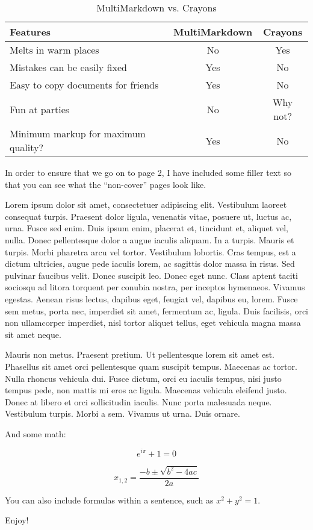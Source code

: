 \begin{table}[htbp]
\begin{minipage}{\linewidth}
\setlength{\tymax}{0.5\linewidth}
\centering
\small
\caption{MultiMarkdown vs. Crayons}
\label{multimarkdownvs.crayons}
\begin{tabular}{@{}lcc@{}} \toprule
Features&MultiMarkdown&Crayons\\
\midrule
Melts in warm places&No&Yes\\
Mistakes can be easily fixed&Yes&No\\
Easy to copy documents for friends&Yes&No\\
Fun at parties&No&Why not?\\

\midrule
Minimum markup for maximum quality?&Yes&No\\

\bottomrule

\end{tabular}
\end{minipage}
\end{table}


In order to ensure that we go on to page 2, I have included some filler text
so that you can see what the ``non-cover'' pages look like.

Lorem ipsum dolor sit amet, consectetuer adipiscing elit. Vestibulum laoreet
consequat turpis. Praesent dolor ligula, venenatis vitae, posuere ut, luctus
ac, urna. Fusce sed enim. Duis ipsum enim, placerat et, tincidunt et, aliquet
vel, nulla. Donec pellentesque dolor a augue iaculis aliquam. In a turpis.
Mauris et turpis. Morbi pharetra arcu vel tortor. Vestibulum lobortis. Cras
tempus, est a dictum ultricies, augue pede iaculis lorem, ac sagittis dolor
massa in risus. Sed pulvinar faucibus velit. Donec suscipit leo. Donec eget
nunc. Class aptent taciti sociosqu ad litora torquent per conubia nostra, per
inceptos hymenaeos. Vivamus egestas. Aenean risus lectus, dapibus eget,
feugiat vel, dapibus eu, lorem. Fusce sem metus, porta nec, imperdiet sit
amet, fermentum ac, ligula. Duis facilisis, orci non ullamcorper imperdiet,
nisl tortor aliquet tellus, eget vehicula magna massa sit amet neque.

Mauris non metus. Praesent pretium. Ut pellentesque lorem sit amet est.
Phasellus sit amet orci pellentesque quam suscipit tempus. Maecenas ac tortor.
Nulla rhoncus vehicula dui. Fusce dictum, orci eu iaculis tempus, nisi justo
tempus pede, non mattis mi eros ac ligula. Maecenas vehicula eleifend justo.
Donec at libero et orci sollicitudin iaculis. Nunc porta malesuada neque.
Vestibulum turpis. Morbi a sem. Vivamus ut urna. Duis ornare.

And some math:

\[ {e}^{i\pi }+1=0 \]

\[ {x}_{1,2}=\frac{-b\pm \sqrt{{b}^{2}-4ac}}{2a} \]

You can also include formulas within a sentence, such as
\({x}^{2}+{y}^{2}=1\).

Enjoy!




